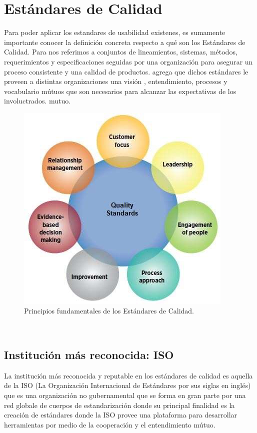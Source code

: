 \section{Estándares de Calidad}
Para poder aplicar los estandares de usabilidad existenes, es sumamente importante conocer la
definición concreta respecto a qué son los Estándares de Calidad. Para %
nos referimos a conjuntos de lineamientos, sistemas, métodos, requerimientos y especificaciones
seguidas por una organización para asegurar un proceso consistente y una calidad de productos.
agrega que dichos estándares le proveen a distintas organizaciones una visión , entendimiento,
procesos y vocabulario mútuos que son necesarios para alcanzar las expectativas de los involuctrados.
mutuo.
\begin{figure}[t]
    \centering
    \includegraphics[scale=0.4]{../images/images/fig1.JPG}
    \caption{Principios fundamentales de los Estándares de Calidad.}
    \label{fig:fig1}    
\end{figure}
\\

\subsection{Institución más reconocida: ISO}
La institución más reconocida y reputable en los estándares de calidad es aquella de la ISO
(La Organización Internacional de Estándares por sus siglas en inglés) que es una organización
no gubernamental que se forma en gran parte por una red globale de cuerpos de estandarización
donde su principal finalidad es la creación de estándares donde la ISO provee una plataforma
para desarrollar herramientas por medio de la cooperación y el entendimiento mútuo. %
\\

